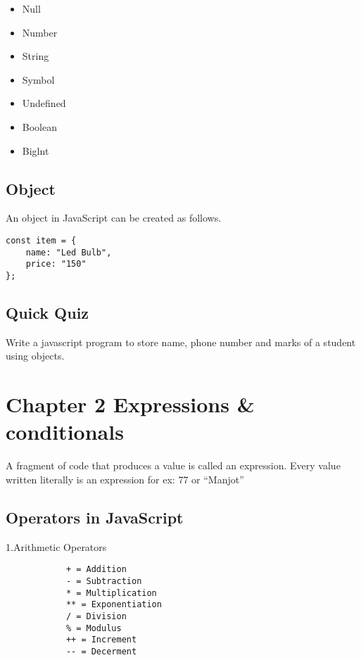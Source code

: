 \documentclass[11pt]{article}
\begin{document}
\begin{itemize}
\item Null
\item Number
\item String
\item Symbol
\item Undefined
\item Boolean
\item Biglnt
\end{itemize}
\subsection*{Object}
\label{sec:org0d51fa3}
An object in JavaScript can be created as follows.\\

\begin{verbatim}
const item = {
    name: "Led Bulb",
    price: "150"
};
\end{verbatim}
\subsection*{Quick Quiz}
\label{sec:org4108bea}
Write a javascript program to store name, phone number and marks of a student using objects.

\newpage
\section*{Chapter 2 Expressions \& conditionals}
\label{sec:org1b4cf7c}
A fragment of code that produces a value is called an expression. Every value written literally is an expression for ex: 77 or ``Manjot''
\subsection*{Operators in JavaScript}
\label{sec:orgc0116ba}
1.Arithmetic Operators \\
\begin{verbatim}
            + = Addition
            - = Subtraction
            * = Multiplication
            ** = Exponentiation
            / = Division
            % = Modulus
            ++ = Increment
            -- = Decerment

\end{verbatim}
\end{document}
